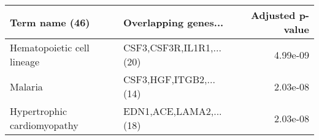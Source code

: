 \begin{tabular}{llr}
\toprule
             Term name (46) &     Overlapping genes... &  Adjusted p-value \\
\midrule
 Hematopoietic cell lineage & CSF3,CSF3R,IL1R1,...(20) &          4.99e-09 \\
                    Malaria &   CSF3,HGF,ITGB2,...(14) &          2.03e-08 \\
Hypertrophic cardiomyopathy &   EDN1,ACE,LAMA2,...(18) &          2.03e-08 \\
\bottomrule
\end{tabular}
